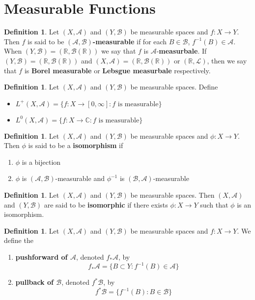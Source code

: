 \documentclass{book}
\theoremstyle{definition}
\newtheorem{defn}[definition]{Definition}
\newcommand{\C}{\mathbb{C}}
\newcommand{\R}{\mathbb{R}}
\newcommand{\MA}{\mathcal{A}}
\newcommand{\MB}{\mathcal{B}}
\newcommand{\ML}{\mathcal{L}}
\newcommand{\ld}[1]{\label{defn:#1}}
\DeclareMathOperator*{\0}{\mbf{0}}
\DeclareMathOperator*{\1}{\mbf{1}}
\newcommand{\RG}{[0,\infty]}
\begin{document}
	\newpage
	\section{Measurable Functions}
	
	\begin{defn} \ld{00000} 
		Let $(X,\MA)$ and $(Y, \MB)$ be measurable spaces and $f:X \rightarrow Y$. Then $f$ is said to be \textbf{$(\MA,\MB)$-measurable} if for each $B \in \MB$, $f^{-1}(B) \in \MA$. When $(Y, \MB) = (\R, \MB(\R))$ we say that $f$ is $\MA$-\textbf{measurbale}. If $(Y,\MB) = (\R, \MB(\R))$ and $(X,\MA) = (\R, \MB(\R))$ or $(\R, \ML)$, then we say that $f$ is \textbf{Borel measurable} or \textbf{Lebsgue measurbale} respectively.
	\end{defn}
	
	\begin{defn} \ld{00000} 
		Let $(X, \MA)$ and $(Y, \MB)$ be measurable spaces. Define 
		\begin{itemize}
			\item $L^{+}(X, \MA) = \{f:X \rightarrow \RG : f \text{ is measurable}\}$
			\item $L^0(X, \MA) = \{f:X \rightarrow \C : f \text{ is measurable}\}$ 
		\end{itemize}
	\end{defn}
	
	\begin{defn}
		Let $(X, \MA)$ and $(Y, \MB)$ be measurable spaces and $\phi: X \rightarrow Y$. Then $\phi$ is said to be a \textbf{isomorphism} if 
		\begin{enumerate}
			\item $\phi$ is a bijection
			\item $\phi$ is $(\MA, \MB)$-measurable and $\phi^{-1}$ is $(\MB, \MA)$-measurable
		\end{enumerate}
	\end{defn}

	\begin{defn}
		Let $(X, \MA)$ and $(Y, \MB)$ be measurable spaces. Then $(X, \MA)$ and $(Y, \MB)$ are said to be \textbf{isomorphic} if there exists $\phi:X \rightarrow Y$ such that $\phi$ is an isomorphism.
	\end{defn}
	
	\begin{defn}
		Let $(X, \MA)$ and $(Y,\MB)$ be measurable spaces and $f: X \rightarrow Y$. We define the 
		\begin{enumerate}
			\item \textbf{pushforward of $\MA$}, denoted $f_*\MA$, by 
			$$f_*\MA = \{B \subset Y: f^{-1}(B) \in \MA\}$$ 
			\item  \textbf{pullback of $\MB$}, denoted $f^*\MB$, by  
			$$f^*\MB = \{f^{-1}(B):  B \in \MB \}$$
		\end{enumerate}
	\end{defn}
	
\end{document}
